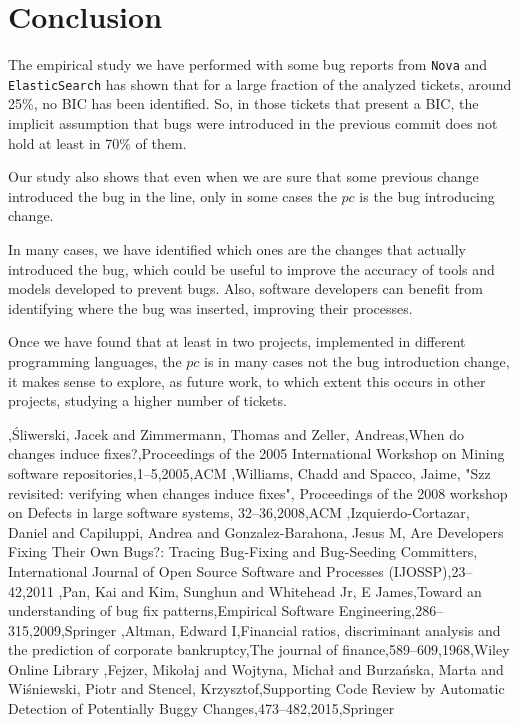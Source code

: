 \documentclass[conference]{IEEEtran}
\begin{document}
\section{Conclusion}

The empirical study we have performed with some bug reports from \texttt{Nova} and \texttt{ElasticSearch} has shown that for a large fraction of the analyzed tickets, around 25\%, no BIC has been identified.
So, in those tickets that present a BIC, the implicit assumption that bugs were introduced in the previous commit does not hold at least in 70\% of them.

Our study also shows that even when we are sure that some previous change introduced the bug in the line, only in some cases the $pc$ is the bug introducing change. %

In many cases, we have identified which ones are the changes that actually introduced the bug, which could be useful to improve the accuracy of tools and models developed to prevent bugs.
Also, software developers can benefit from identifying where the bug was inserted, improving their processes.

Once we have found that at least in two projects, implemented in different programming languages, the $pc$ is in many cases not the bug introduction change, it makes sense to explore, as future work, to which extent this occurs in other projects, studying a higher number of tickets.


\begin{thebibliography}{1}

,{\'S}liwerski, Jacek and Zimmermann, Thomas and Zeller, Andreas,When do changes induce fixes?,Proceedings of the 2005 International Workshop on Mining software repositories,1--5,2005,ACM
,Williams, Chadd and Spacco, Jaime, "Szz revisited: verifying when changes induce fixes", Proceedings of the 2008 workshop on Defects in large software systems, 32--36,2008,ACM
,Izquierdo-Cortazar, Daniel and Capiluppi, Andrea and Gonzalez-Barahona, Jesus M, Are Developers Fixing Their Own Bugs?: Tracing Bug-Fixing and Bug-Seeding Committers,
  International Journal of Open Source Software and Processes (IJOSSP),23--42,2011
,Pan, Kai and Kim, Sunghun and Whitehead Jr, E James,Toward an understanding of bug fix patterns,Empirical Software Engineering,286--315,2009,Springer
,Altman, Edward I,Financial ratios, discriminant analysis and the prediction of corporate bankruptcy,The journal of finance,589--609,1968,Wiley Online Library
,Fejzer, Miko{\l}aj and Wojtyna, Micha{\l} and Burza{\'n}ska, Marta and Wi{\'s}niewski, Piotr and Stencel, Krzysztof,Supporting Code Review by Automatic Detection of Potentially Buggy Changes,473--482,2015,Springer
\end{thebibliography}




\end{document}
